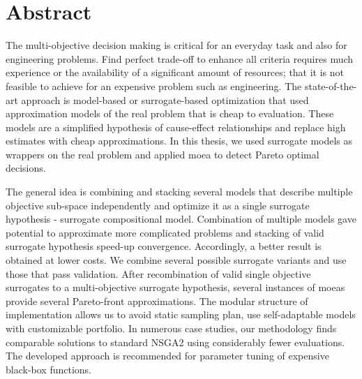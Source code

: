 \section*{Abstract}
    The multi-objective decision making is critical for an everyday task and also for engineering problems. Find perfect trade-off to enhance all criteria requires much experience or the availability of a significant amount of resources; that it is not feasible to achieve for an expensive problem such as engineering. The state-of-the-art approach is model-based or surrogate-based optimization that used approximation models of the real problem that is cheap to evaluation. These models are a simplified hypothesis of cause-effect relationships and replace high estimates with cheap approximations. In this thesis, we used surrogate models as wrappers on the real problem and applied \gls{moea} to detect  Pareto optimal decisions. 
    
    The general idea is combining and stacking several models that describe multiple objective sub-space independently and optimize it as a single surrogate hypothesis - surrogate compositional model. Combination of multiple models gave potential to approximate more complicated problems and stacking of valid surrogate hypothesis speed-up convergence. Accordingly, a better result is obtained at lower costs.
    We combine several possible surrogate variants and use those that pass validation. After recombination of valid single objective surrogates to a multi-objective surrogate hypothesis, several instances of \gls{moea}s provide several Pareto-front approximations. The modular structure of implementation allows us to avoid static sampling plan, use self-adaptable models with customizable portfolio. In numerous case studies, our methodology finds comparable solutions to standard NSGA2 using considerably fewer evaluations. The developed approach is recommended for parameter tuning of expensive black-box functions.